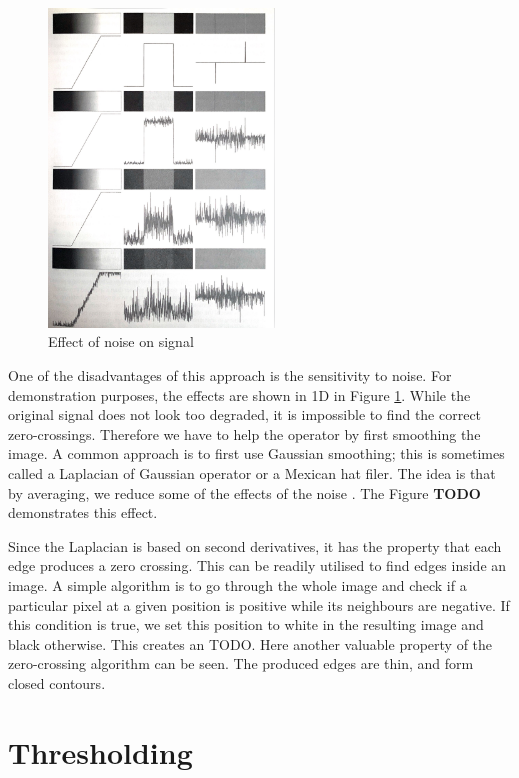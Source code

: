\documentclass[
  digital,     %
  oneside,     %
  nosansbold,  %
  nocolorbold, %
  lof,         %
  lot,         %
]{fithesis4}
\begin{document}
\begin{figure}
    \begin{center}
        \includegraphics[width=6cm]{"resources/gonzalez_edges_and_noise.jpg"}
    \end{center}
    \caption{Effect of noise on signal \cite{gonzalez2002}}
    \label{fig:edges_noise}
\end{figure}

One of the disadvantages of this approach is the sensitivity to noise. For
demonstration purposes, the effects are shown in 1D in Figure
\ref{fig:edges_noise}. While the original
signal does not look too degraded, it is impossible to find the correct
zero-crossings. Therefore we have to help the operator by first smoothing the
image. A common approach is to first use Gaussian smoothing; this is sometimes
called a Laplacian of Gaussian operator or a Mexican hat filer. The idea is that
by averaging, we reduce some of the effects of the noise
\cite{hipr-mexican-hat}. The Figure \textbf{TODO} demonstrates this effect.

Since the Laplacian is based on second derivatives, it has the property that
each edge produces a zero crossing. This can be readily utilised to find edges
inside an image. A simple algorithm is to go through the whole image and check
if a particular pixel at a given position is positive while its neighbours are
negative. If this condition is true, we set this position to white in the
resulting image and black otherwise. This creates an TODO. Here another valuable
property of the zero-crossing algorithm can be seen. The produced edges are
thin, and form closed contours.

\section{Thresholding}
\end{document}
